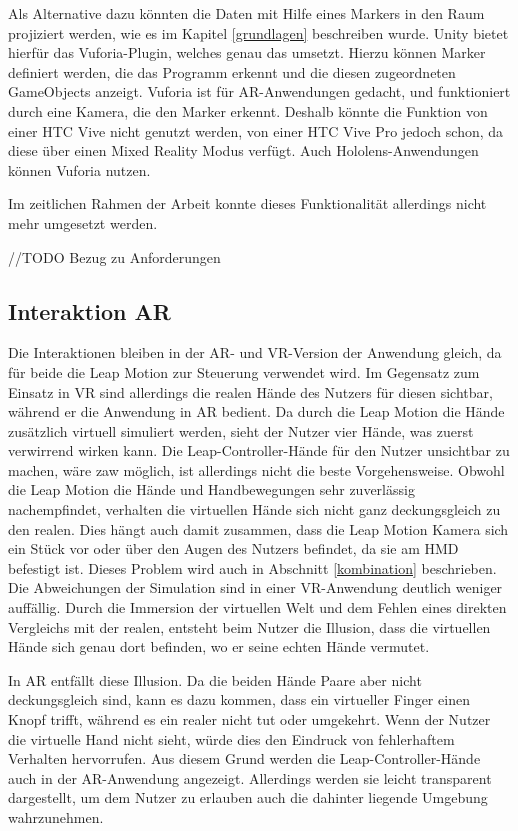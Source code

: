 Als Alternative dazu könnten die Daten mit Hilfe eines Markers in den Raum projiziert werden, wie es im Kapitel \ref{grundlagen} beschreiben wurde. Unity bietet hierfür das Vuforia-Plugin, welches genau das umsetzt. Hierzu können Marker definiert werden, die das Programm erkennt und die diesen zugeordneten GameObjects anzeigt. 
Vuforia ist für AR-Anwendungen gedacht, und funktioniert durch eine Kamera, die den Marker erkennt. Deshalb könnte die Funktion von einer HTC Vive nicht genutzt werden, von einer HTC Vive Pro jedoch schon, da diese über einen Mixed Reality Modus verfügt. Auch Hololens-Anwendungen können Vuforia nutzen. 

Im zeitlichen Rahmen der Arbeit konnte dieses Funktionalität allerdings nicht mehr umgesetzt werden.

//TODO 
Bezug zu Anforderungen

\subsection{Interaktion AR}

Die Interaktionen bleiben in der AR- und VR-Version der Anwendung gleich, da für beide die Leap Motion zur Steuerung verwendet wird.
Im Gegensatz zum Einsatz in VR sind allerdings die realen Hände des Nutzers für diesen sichtbar, während er die Anwendung in AR bedient. Da durch die Leap Motion die Hände zusätzlich virtuell simuliert werden, sieht der Nutzer vier Hände, was zuerst verwirrend wirken kann. 
Die Leap-Controller-Hände für den Nutzer unsichtbar zu machen, wäre zaw möglich, ist allerdings nicht die beste Vorgehensweise. Obwohl die Leap Motion die Hände und Handbewegungen sehr zuverlässig nachempfindet, verhalten die virtuellen Hände sich nicht ganz deckungsgleich zu den realen. Dies hängt auch damit zusammen, dass die Leap Motion Kamera sich ein Stück vor oder über den Augen des Nutzers befindet, da sie am HMD befestigt ist. Dieses Problem wird auch in Abschnitt \ref{kombination} beschrieben.
Die Abweichungen der Simulation sind in einer VR-Anwendung deutlich weniger auffällig. Durch die Immersion der virtuellen Welt und dem Fehlen eines direkten Vergleichs mit der realen, entsteht beim Nutzer die Illusion, dass die virtuellen Hände sich genau dort befinden, wo er seine echten Hände vermutet.

In AR entfällt diese Illusion. Da die beiden Hände Paare aber nicht deckungsgleich sind, kann es dazu kommen, dass ein virtueller Finger einen Knopf trifft, während es ein realer nicht tut oder umgekehrt. Wenn der Nutzer die virtuelle Hand nicht sieht, würde dies den Eindruck von fehlerhaftem Verhalten hervorrufen. 
Aus diesem Grund werden die Leap-Controller-Hände auch in der AR-Anwendung angezeigt. Allerdings werden sie leicht transparent dargestellt, um dem Nutzer zu erlauben auch die dahinter liegende Umgebung wahrzunehmen. 

